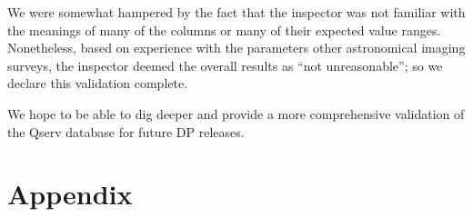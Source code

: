 \documentclass[DM,authoryear,toc]{lsstdoc}
\begin{document}
We were somewhat hampered by the fact that the inspector was not
familiar with the meanings of many of the columns or many of their
expected value ranges.  Nonetheless, based on experience with the
parameters other astronomical imaging surveys, the inspector deemed
the overall results as ``not unreasonable''; so we declare this
validation complete.

We hope to be able to dig deeper and provide a more comprehensive
validation of the Qserv database for future DP releases.

\clearpage

\appendix

\section{Appendix} \label{sec:appendix}
\end{document}
